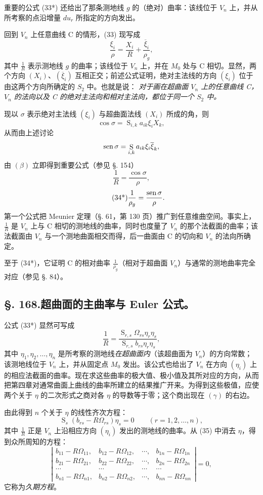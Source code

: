 重要的公式 (33*) 还给出了那条测地线 \(g\) 的（绝对）曲率：该线位于 \(V_n\) 上，并从所考察的点沿增量 \(du_r\) 所指定的方向发出。

回到 \(V_n\) 上任意曲线 C 的情形，(33) 现写成
\[
\tag{$\beta$}
 \frac{\xi_i}{\rho}=\frac{X_i}{R}+\frac{\overline{\xi}_i}{\rho_g},
\]
其中 \(\frac1R\) 表示测地线 \(g\) 的曲率；该线位于 \(V_n\) 上，并在 \(M_0\) 处与 C 相切。显然，两个方向 \((X_i)\)、\((\overline{\xi}_i)\) 互相正交；前述公式证明，绝对主法线的方向 \((\xi_i)\) 位于由这两个方向所确定的 \(S_2\) 中。也就是说：
\emph{对于画在超曲面 \(V_n\) 上的任意曲线 C，\(V_n\) 的法向以及 C 的绝对主法向和相对主法向，都位于同一个 \(S_2\) 中。}

现以 \(\sigma\) 表示绝对主法线 \((\xi_i)\) 与超曲面法线 \((X_i)\) 所成的角，则
\[
 \cos\sigma=\mathop{\mathrm{S}}_{i,k}a_{ik}\xi_iX_k,
\]
从而由上述讨论
\[
 \operatorname{sen}\sigma=\mathop{\mathrm{S}}_{i,k}a_{ik}\xi_i\overline{\xi}_k,
\]
由 \((\beta)\) 立即得到重要公式（参见 \S. 154）
\[
\tag{34}
 \frac1R=\frac{\cos\sigma}{\rho},
\]
\[
\tag{34*}
 \frac1{\rho_g}=\frac{\operatorname{sen}\sigma}{\rho}.
\]
第一个公式把 Meunier 定理（\S. 61，第 130 页）推广到任意维曲空间。事实上，\(\frac1R\) 是 \(V_n\) 上与 C 相切的测地线的曲率，同时也度量了 \(V_n\) 的那个法截面的曲率；该法截面由 \(V_n\) 与一个测地曲面相交而得，后一曲面由 C 的切向和 \(V_n\) 的法向所确定。

至于 (34*)，它证明 C 的相对曲率 \(\frac1{\rho_g}\)（相对于超曲面 \(V_n\)）与通常的测地曲率完全对应（参见 \S. 84）。

\subsection*{\S. 168.\quad 超曲面的主曲率与 Euler 公式。}

公式 (33*) 显然可写成
\[
\tag{$\gamma$}
 \frac1R=\frac{\mathop{\mathrm{S}}_{r,s}\Omega_{rs}\eta_r\eta_s}
 {\mathop{\mathrm{S}}_{r,s}b_{rs}\eta_r\eta_s},
\]
其中 \(\eta_1,\eta_2,\ldots,\eta_n\) 是所考察的测地线\emph{在超曲面内}（该超曲面为 \(V_n\)）的方向常数；该测地线位于 \(V_n\) 上，并从固定点 \(M_0\) 发出。该公式也给出了 \(V_n\) 在方向 \((\eta_i)\) 上的相应法截面的曲率。现在求这些曲率的极大值、极小值及其所对应的方向，从而把第四章对通常曲面上曲线的曲率所建立的结果推广开来。为得到这些极值，应使两个关于 \(\eta\) 的二次形式之商对各 \(\eta\) 的导数等于零；这个商出现在 \((\gamma)\) 的右边。

由此得到 \(n\) 个关于 \(\eta\) 的线性齐次方程：
\[
\tag{35}
 \mathop{\mathrm{S}}_s(b_{rs}-R\Omega_{rs})\eta_s=0\qquad (r=1,2,\ldots,n),
\]
其中 \(\frac1R\) 正是 \(V_n\) 上沿相应方向 \((\eta_i)\) 发出的测地线的曲率。从 (35) 中消去 \(\eta\)，得到众所周知的方程：
\[
\tag{36}
\left|\begin{matrix}
b_{11}-R\Omega_{11},& b_{12}-R\Omega_{12},& \cdots,& b_{1n}-R\Omega_{1n}\\
b_{21}-R\Omega_{21},& b_{22}-R\Omega_{22},& \cdots,& b_{2n}-R\Omega_{2n}\\
\cdots&\cdots&\cdots&\cdots\\
b_{n1}-R\Omega_{n1},& b_{n2}-R\Omega_{n2},& \cdots,& b_{nn}-R\Omega_{nn}
\end{matrix}\right|=0,
\]
它称为\emph{久期方程}。

